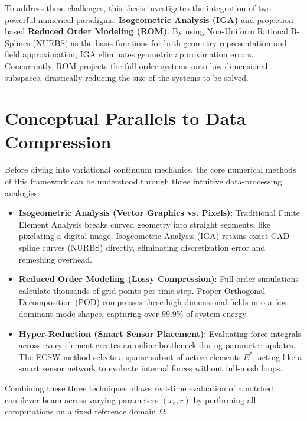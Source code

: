 To address these challenges, this thesis investigates the integration of two powerful numerical paradigms: \textbf{Isogeometric Analysis (IGA)} and projection-based \textbf{Reduced Order Modeling (ROM)}. By using Non-Uniform Rational B-Splines (NURBS) as the basis functions for both geometry representation and field approximation, IGA eliminates geometric approximation errors. Concurrently, ROM projects the full-order systems onto low-dimensional subspaces, drastically reducing the size of the systems to be solved.

\section{Conceptual Parallels to Data Compression}

Before diving into variational continuum mechanics, the core numerical methods of this framework can be understood through three intuitive data-processing analogies:

\begin{itemize}[leftmargin=*]
    \item \textbf{Isogeometric Analysis (Vector Graphics vs. Pixels)}: Traditional Finite Element Analysis breaks curved geometry into straight segments, like pixelating a digital image. Isogeometric Analysis (IGA) retains exact CAD spline curves (NURBS) directly, eliminating discretization error and remeshing overhead.
    \item \textbf{Reduced Order Modeling (Lossy Compression)}: Full-order simulations calculate thousands of grid points per time step. Proper Orthogonal Decomposition (POD) compresses these high-dimensional fields into a few dominant mode shapes, capturing over $99.9\%$ of system energy.
    \item \textbf{Hyper-Reduction (Smart Sensor Placement)}: Evaluating force integrals across every element creates an online bottleneck during parameter updates. The ECSW method selects a sparse subset of active elements $E^*$, acting like a smart sensor network to evaluate internal forces without full-mesh loops.
\end{itemize}

Combining these three techniques allows real-time evaluation of a notched cantilever beam across varying parameters $(x_c, r)$ by performing all computations on a fixed reference domain $\hat{\Omega}$.

